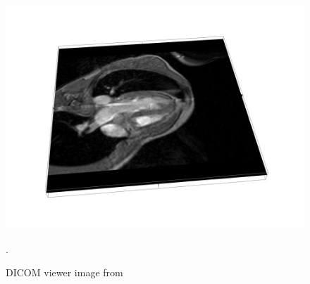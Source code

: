 \begin{figure}[ht]
   \centering
   \includegraphics[width=\imglength]{images/dicom_demo}
   \caption{DICOM viewer image from }.
   \label{fig:dicom:demo}
\end{figure}


%
%
